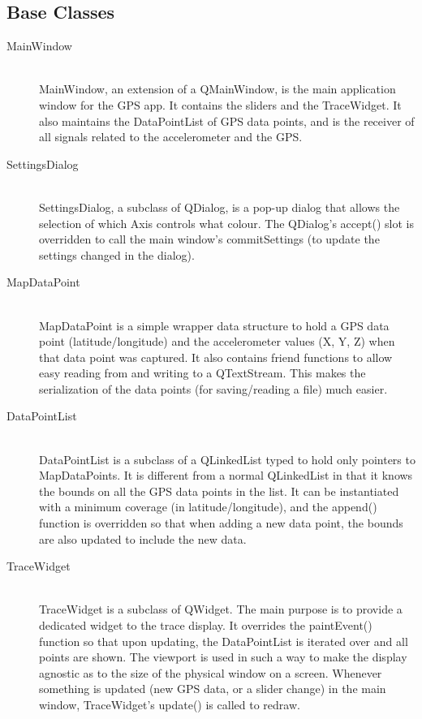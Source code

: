 \documentclass[12pt]{article}
\begin{document}
\subsection{Base Classes}
\begin{description}
\item[MainWindow] \hfill \\
MainWindow, an extension of a QMainWindow, is the main application window for
the GPS app.  It contains the sliders and the TraceWidget.  It also maintains
the DataPointList of GPS data points, and is the receiver of all signals related
to the accelerometer and the GPS.
\item[SettingsDialog] \hfill \\
SettingsDialog, a subclass of QDialog, is a pop-up dialog that allows the
selection of which Axis controls what colour.  The QDialog's accept() slot is
overridden to call the main window's commitSettings (to update the settings
changed in the dialog).
\item[MapDataPoint] \hfill \\
MapDataPoint is a simple wrapper data structure to hold a GPS data point
(latitude/longitude) and the accelerometer values (X, Y, Z) when that data point
was captured.  It also contains friend functions to allow easy reading from and
writing to a QTextStream.  This makes the serialization of the data points (for
saving/reading a file) much easier.
\item[DataPointList] \hfill \\
DataPointList is a subclass of a QLinkedList typed to hold only pointers to
MapDataPoints.  It is different from a normal QLinkedList in that it knows the
bounds on all the GPS data points in the list.  It can be instantiated with a
minimum coverage (in latitude/longitude), and the append() function is
overridden so that when adding a new data point, the bounds are also updated to
include the new data.
\item[TraceWidget] \hfill \\
TraceWidget is a subclass of QWidget.  The main purpose is to provide a
dedicated widget to the trace display.  It overrides the paintEvent() function
so that upon updating, the DataPointList is iterated over and all points are
shown.  The viewport is used in such a way to make the display agnostic as to
the size of the physical window on a screen.  Whenever something is updated (new
GPS data, or a slider change) in the main window, TraceWidget's update() is
called to redraw.
\end{description}
\end{document}
